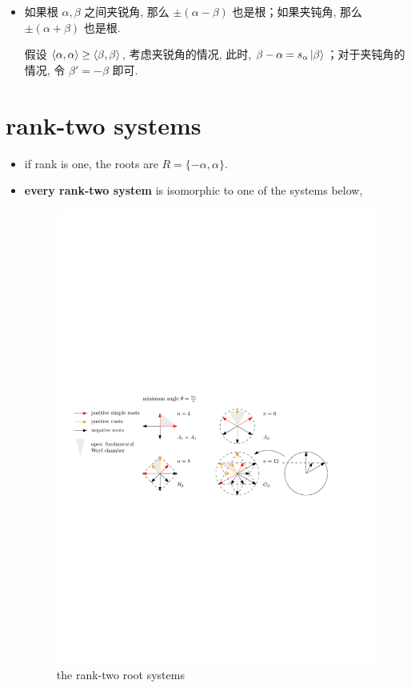 \begin{itemize}
	\item 如果根 $\alpha, \beta$ 之间夹锐角, 那么 $\pm (\alpha - \beta)$ 也是根；如果夹钝角, 那么 $\pm (\alpha + \beta)$ 也是根.
	
	\begin{tcolorbox}[title=proof:]
		假设 $\braket{\alpha, \alpha} \geq \braket{\beta, \beta}$, 考虑夹锐角的情况, 此时, $\beta - \alpha = s_\alpha \ket{\beta}$；对于夹钝角的情况, 令 $\beta' = - \beta$ 即可.
	\end{tcolorbox}
\end{itemize}

\section{rank-two systems}
\begin{itemize}
	\item if rank is one, the roots are $R = \{- \alpha, \alpha\}$.
	
	\item \textbf{every rank-two system} is isomorphic to one of the systems below,
	
	\begin{figure}[H]
		\centering
		\includegraphics[scale=1]{figures/the rank-two root systems.pdf}
		\caption{the rank-two root systems}
	\end{figure}
	

\end{itemize}

